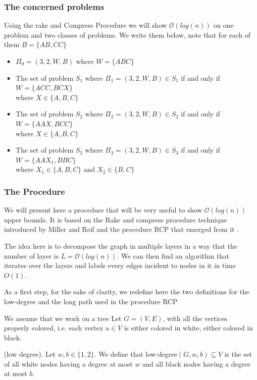 \subsubsection{The concerned problems}
Using the rake and Compress Procedure we will show $\mathcal{O}(log(n))$ on one problem and two classes of problems.
We write them below, note that for each of them $B=\{AB,CC\}$
\begin{itemize}
    \item $\Pi_0 = (3,2,W,B)$ where $W = \{ABC\}$
    \item The set of problem $S_1$ where $\Pi_1 = (3,2,W,B)\in S_1$ if and only if $W = \{ACC,BCX\}$\\where $X\in \{A,B,C\}$
    \item The set of problem $S_2$ where $\Pi_2 = (3,2,W,B)\in S_2$ if and only if $W = \{AAX,BCC\}$\\where $X \in \{A,B,C\}$
    \item The set of problem $S_3$ where $\Pi_3 = (3,2,W,B)\in S_3$ if and only if $W = \{AAX_1,BBC\}$\\where $X_1 \in \{A,B,C\}$ and $X_2\in \{B,C\}$
\end{itemize}
\subsubsection{The Procedure}
We will present here a procedure that will be very useful to show $\mathcal{O}(log(n))$ upper bounds. It is based on the Rake and compress procedure technique introduced by Miller and Reif \cite{RC} and the procedure RCP that emerged from it \cite{1}.

The idea here is to decompose the graph in multiple layers in a way that the number of layer is $L = \mathcal{O}(log(n))$. We can then find an algorithm that iterates over the layers and labels every edges incident to nodes in it in time $O(1)$.

As a first step, for the sake of clarity, we redefine here the two definitions for the low-degree and the long path used in the procedure RCP \cite[p.21]{1}

We assume that we work on a tree Let $G = (V,E)$, with all the vertices properly colored, i.e. each vertex $u\in V$ is either colored in white, either colored in black.

\begin{defi} (low degree).
Let $w,b \in \{1,2\}$. We define that low-degree$(G,w,b)\subseteq V$ is the set of all white nodes having a degree at most $w$ and all black nodes having a degree at most $b$.
\end{defi}

